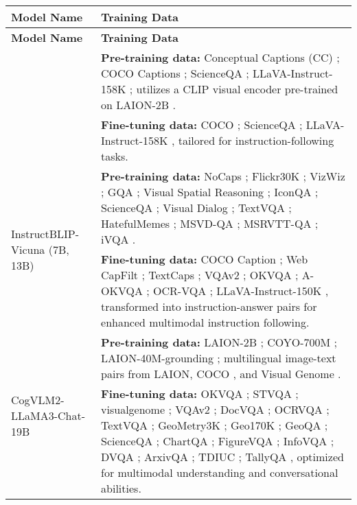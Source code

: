 \begin{longtable}{|l|p{10cm}|}
\hline
\textbf{Model Name} & \textbf{Training Data} \\
\hline
\endfirsthead

\hline
\textbf{Model Name} & \textbf{Training Data} \\
\hline
\endhead

\hline
\endfoot

\hline
\endlastfoot

\multirow{2}{*}{liu2023llava1.5} & 
\textbf{Pre-training data:} Conceptual Captions (CC) \citep{changpinyo2021conceptual}; COCO Captions \citep{lin2014microsoft}; ScienceQA \citep{lu2022scienceqa}; LLaVA-Instruct-158K \citep{liu2023llava}; utilizes a CLIP visual encoder pre-trained on LAION-2B \citep{schuhmann2022laion}. \\
& 
\textbf{Fine-tuning data:} COCO \citep{lin2014microsoft}; ScienceQA \citep{lu2022scienceqa}; LLaVA-Instruct-158K \citep{liu2023llava}, tailored for instruction-following tasks. \\
\hline
\multirow{2}{*}{InstructBLIP-Vicuna (7B, 13B)} & 
\textbf{Pre-training data:} NoCaps \citep{nocaps}; Flickr30K \citep{flickr30k}; VizWiz \citep{vizwiz}; GQA \citep{hudson2019gqa}; Visual Spatial Reasoning \citep{liu2023vsr}; IconQA \citep{iconqa}; ScienceQA \citep{lu2022scienceqa}; Visual Dialog \citep{das2017visualdialog}; TextVQA \citep{singh2019towards}; HatefulMemes \citep{hatefulmemes}; MSVD-QA \citep{msvdqa}; MSRVTT-QA \citep{msrvttqa}; iVQA \citep{ivqa}. \\
& 
\textbf{Fine-tuning data:} COCO Caption \citep{lin2014microsoft}; Web CapFilt \citep{li2022blip, li2022blip}; TextCaps \citep{sidorov2020textcaps}; VQAv2 \citep{goyal2017vqav2}; OKVQA \citep{marino2019okvqa}; A-OKVQA \citep{schwenk2022aokvqa}; OCR-VQA \citep{mishra2019ocrvqa}; LLaVA-Instruct-150K \citep{liu2023llava}, transformed into instruction-answer pairs for enhanced multimodal instruction following. \\
\hline
\multirow{2}{*}{CogVLM2-LLaMA3-Chat-19B} & 
\textbf{Pre-training data:} LAION-2B \citep{schuhmann2022laion}; COYO-700M \citep{byeon2022coyo}; LAION-40M-grounding \citep{zhang2022glipv2}; multilingual image-text pairs from LAION, COCO \citep{lin2014microsoft}, and Visual Genome \citep{visualgenome}. \\
& 
\textbf{Fine-tuning data:} OKVQA \citep{marino2019okvqa}; STVQA \citep{biten2019stvqa}; visualgenome \citep{visualgenome}; VQAv2 \citep{goyal2017vqav2}; DocVQA \citep{mathew2021docvqa}; OCRVQA \citep{mishra2019ocrvqa}; TextVQA \citep{singh2019towards}; GeoMetry3K \citep{lu2021inter}; Geo170K \citep{Geo170K}; GeoQA \citep{GeoQA}; ScienceQA \citep{lu2022scienceqa}; ChartQA \citep{masry2022chartqa}; FigureVQA \citep{FigureQA}; InfoVQA \citep{mathew2022infographicvqa}; DVQA \citep{kafle2018dvqa}; ArxivQA \citep{ArxivQA}; TDIUC \citep{TDIUC}; TallyQA \citep{TallyQA}, optimized for multimodal understanding and conversational abilities. \\

\end{longtable}
